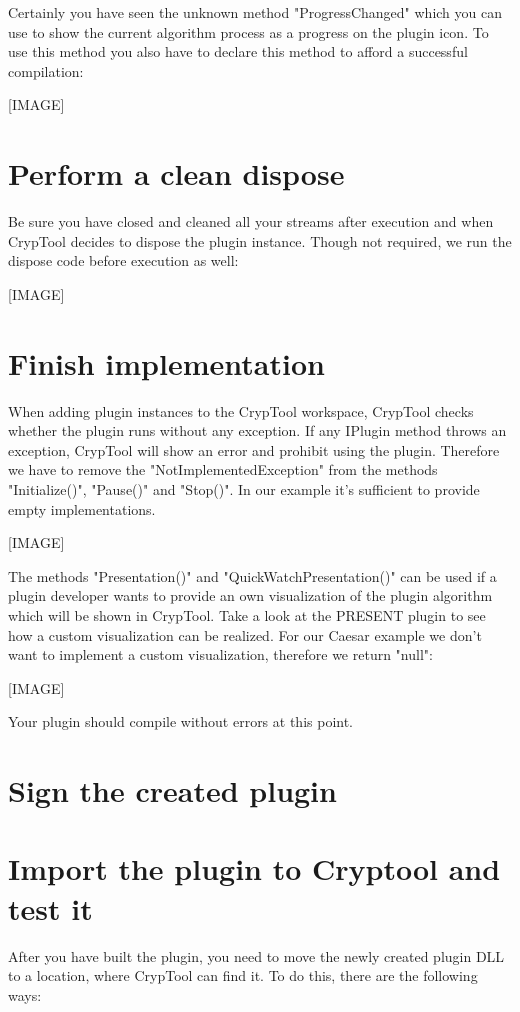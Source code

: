 Certainly you have seen the unknown method "ProgressChanged" which you can use to show the current algorithm process as a progress on the plugin icon.
To use this method you also have to declare this method to afford a successful compilation:

[IMAGE]

\section{Perform a clean dispose}\label{sec:PerformACleanDispose}
Be sure you have closed and cleaned all your streams after execution and when CrypTool decides to dispose the plugin instance. Though not required, we run the dispose code before execution as well:

[IMAGE]
\section{Finish implementation}\label{sec:FinishImplementation}
When adding plugin instances to the CrypTool workspace, CrypTool checks whether the plugin runs without any exception. If any IPlugin method throws an exception, CrypTool will show an error and prohibit using the plugin. Therefore we have to remove the "NotImplementedException" from the methods "Initialize()", "Pause()" and "Stop()". In our example it's sufficient to provide empty implementations.

[IMAGE]

The methods "Presentation()" and "QuickWatchPresentation()" can be used if a plugin developer wants to provide an own visualization of the plugin algorithm which will be shown in CrypTool. Take a look at the PRESENT plugin to see how a custom visualization can be realized. For our Caesar example we don't want to implement a custom visualization, therefore we return "null":

[IMAGE]

Your plugin should compile without errors at this point.
\section{Sign the created plugin}\label{sec:SignTheCreatedPlugin}

\section{Import the plugin to Cryptool and test it}\label{sec:ImportThePluginToCryptoolAndTestIt}
After you have built the plugin, you need to move the newly created plugin DLL to a location, where CrypTool can find it. To do this, there are the following ways:

